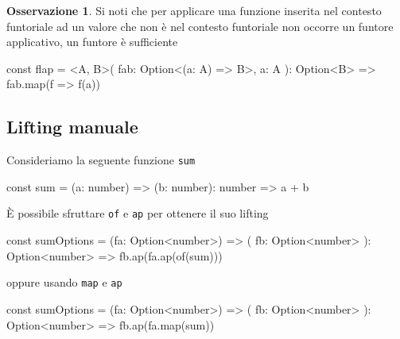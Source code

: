 \documentclass[12pt]{article}
\theoremstyle{definition}
\newtheorem{observation}{Osservazione}[section]
\newenvironment{code}
  {\vspace{0.5cm} \VerbatimEnvironment\begin{typescriptcode}}
  {\end{typescriptcode} \vspace{0.2cm}}
\begin{document}






\begin{observation}
Si noti che per applicare una funzione inserita nel contesto funtoriale ad un valore
che non è nel contesto funtoriale non occorre un funtore applicativo, un funtore è sufficiente
\end{observation}

\begin{code}
const flap = <A, B>(
  fab: Option<(a: A) => B>,
  a: A
): Option<B> => fab.map(f => f(a))
\end{code}

\subsection{Lifting manuale}

Consideriamo la seguente funzione \texttt{sum}

\begin{code}
const sum = (a: number) => (b: number): number => a + b
\end{code}

È possibile sfruttare \texttt{of} e \texttt{ap} per ottenere il suo lifting

\begin{code}
const sumOptions = (fa: Option<number>) => (
  fb: Option<number>
): Option<number> => fb.ap(fa.ap(of(sum)))
\end{code}

oppure usando \texttt{map} e \texttt{ap}

\begin{code}
const sumOptions = (fa: Option<number>) => (
  fb: Option<number>
): Option<number> => fb.ap(fa.map(sum))
\end{code}
\end{document}
